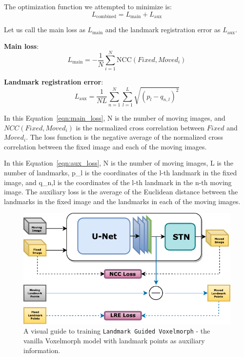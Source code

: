 \documentclass{book}
\begin{document}
	The optimization function we attempted to minimize is:
	\begin{equation}
	L_\text{combined} = L_\text{main} + L_\text{aux} \label{eqn:combined_loss}
	\end{equation}	
	
	Let us call the main loss as $L_\text{main}$ and the landmark registration error as $L_\text{aux}$.
	
	\textbf{Main loss}:
	\begin{equation}
	L_\text{main} = -\frac{1}{N} \sum_{i=1}^N \text{NCC}(Fixed, Moved_i) \label{eqn:main_loss}
	\end{equation}
	
	\textbf{Landmark registration error}:
	\begin{equation}
		L_\text{aux} = \frac{1}{NL} \sum_{n=1}^N \sum_{l=1}^L \sqrt{(p_l - q_{n,l})^2}
		\label{eqn:aux_loss}
	\end{equation}
	
	In this Equation~\ref{eqn:main_loss}, N is the number of moving images, and $NCC(Fixed, Moved_i)$ is the normalized cross correlation between $Fixed$ and $Moved_i$. The loss function is the negative average of the normalized cross correlation between the fixed image and each of the moving images.
	
	In this Equation~\ref{eqn:aux_loss}, N is the number of moving images, L is the number of landmarks, p\_l is the coordinates of the l-th landmark in the fixed image, and q\_{n,l} is the coordinates of the l-th landmark in the n-th moving image. The auxiliary loss is the average of the Euclidean distance between the landmarks in the fixed image and the landmarks in each of the moving images.
	
	\begin{figure}[h!]
		\centering
		\includegraphics[width=0.6\columnwidth]{resources/chapter4/methods/Method2.pdf}
		\caption{A visual guide to training \texttt{Landmark Guided Voxelmorph} - the vanilla Voxelmorph model with landmark points as auxiliary information.}
		\label{fig:block_method2}
	\end{figure}
\end{document}

